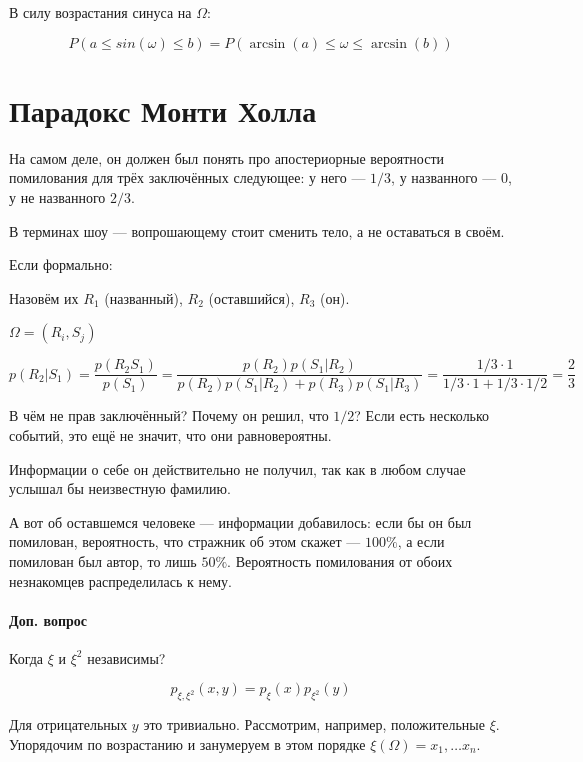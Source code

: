 \documentclass[12pt, a4paper]{article}
\begin{document}
В силу возрастания синуса на $\Omega$:

\begin{equation}
  P(a \leqslant sin(\omega) \leqslant b) = P(\arcsin(a) \leqslant \omega \leqslant \arcsin(b))
\end{equation}


\section{Парадокс Монти Холла}

На самом деле, он должен был понять про апостериорные вероятности
помилования для трёх заключённых следующее: у него — $1/3$, у названного — $0$,
у не названного $2/3$.

В терминах шоу — вопрошающему стоит сменить тело, а не оставаться в своём.

Если формально:

Назовём их $R_1$ (названный), $R_2$ (оставшийся), $R_3$ (он).

$\Omega = {(R_i, S_j)}$


\begin{equation}
  p(R_2 | S_1) = \frac{p(R_2 S_1)}{p(S_1)} = \frac{p(R_2) p(S_1 | R_2)}{p(R_2) p(S_1 | R_2) + p(R_3) p(S_1 | R_3)} = 
  \frac{1/3 \cdot 1}{1/3 \cdot 1 + 1/3 \cdot 1/2} = \frac{2}{3}
\end{equation}

В чём не прав заключённый? Почему он решил, что $1/2$?
Если есть несколько событий, это ещё не значит, что они равновероятны.

Информации о себе он действительно не получил,
так как в любом случае услышал бы неизвестную фамилию.

А вот об оставшемся человеке — информации добавилось: 
если бы он был помилован, вероятность, что стражник об этом скажет — $100\%$,
а если помилован был автор, то лишь $50\%$.
Вероятность помилования от обоих незнакомцев распределилась к нему. 


\paragraph{Доп. вопрос} Когда $\xi$ и $\xi^2$ независимы?

\begin{equation}\label{eq:indep}
  p_{\xi, \xi^2}(x, y) = p_\xi(x)p_{\xi^2}(y)
\end{equation}

Для отрицательных $y$ это тривиально. Рассмотрим, например, положительные $\xi$.
Упорядочим по возрастанию и занумеруем в этом порядке $\xi(\Omega) = x_1, … x_n$.
\end{document}
